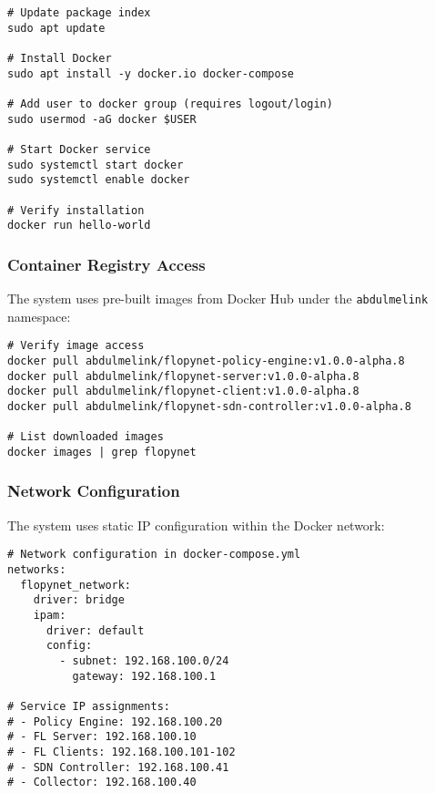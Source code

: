 \begin{lstlisting}[style=bashcode, caption=Docker Installation (Ubuntu)]
# Update package index
sudo apt update

# Install Docker
sudo apt install -y docker.io docker-compose

# Add user to docker group (requires logout/login)
sudo usermod -aG docker $USER

# Start Docker service
sudo systemctl start docker
sudo systemctl enable docker

# Verify installation
docker run hello-world
\end{lstlisting}

\subsubsection{Container Registry Access}

The system uses pre-built images from Docker Hub under the \texttt{abdulmelink} namespace:

\begin{lstlisting}[style=bashcode, caption=Container Image Verification]
# Verify image access
docker pull abdulmelink/flopynet-policy-engine:v1.0.0-alpha.8
docker pull abdulmelink/flopynet-server:v1.0.0-alpha.8
docker pull abdulmelink/flopynet-client:v1.0.0-alpha.8
docker pull abdulmelink/flopynet-sdn-controller:v1.0.0-alpha.8

# List downloaded images
docker images | grep flopynet
\end{lstlisting}

\subsubsection{Network Configuration}

The system uses static IP configuration within the Docker network:

\begin{lstlisting}[style=dockercode, caption=Network Configuration]
# Network configuration in docker-compose.yml
networks:
  flopynet_network:
    driver: bridge
    ipam:
      driver: default
      config:
        - subnet: 192.168.100.0/24
          gateway: 192.168.100.1

# Service IP assignments:
# - Policy Engine: 192.168.100.20
# - FL Server: 192.168.100.10
# - FL Clients: 192.168.100.101-102
# - SDN Controller: 192.168.100.41
# - Collector: 192.168.100.40
\end{lstlisting}

